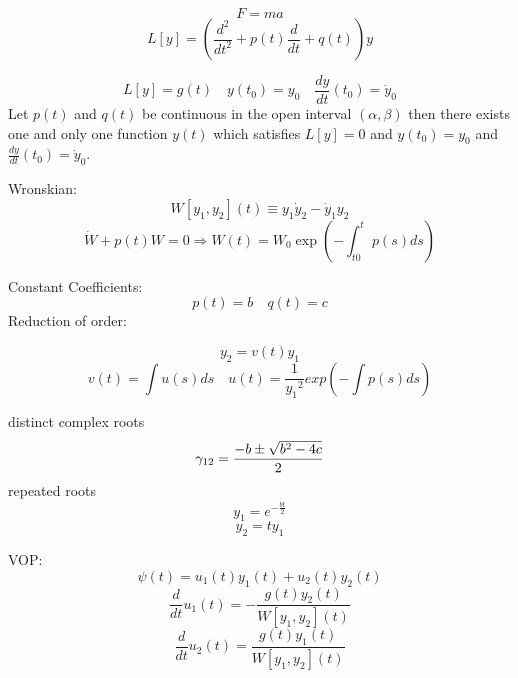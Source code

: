 \[
  F = m a
\]
\[
  L[y] =  \left( \frac{d^2}{dt^2} + p(t) \frac{d}{dt} + q(t) \right) y
\]

\[
  L[y] = g(t) \quad y(t_0) = y_0 \quad \frac{dy}{dt} (t_0) = {\dot y}_0
\]
Let $p(t)$ and $q(t)$ be continuous in the open interval $(\alpha,\beta)$ then
there exists one and only one function $y(t)$ which satisfies $L[y] = 0$ and
$y(t_0) = y_0$ and $\frac{dy}{dt}(t_0) = {\dot y}_0$.

Wronskian:
\[
  W[y_1,y_2](t) \equiv y_1 {\dot y}_2 - {\dot y}_1 y_2
\]
\[
  {\dot W} + p(t) W = 0 \Rightarrow W(t) = W_0 \exp \left( -\int_{t0}^{t} p(s) ds \right)
\]

Constant Coefficients:
\[
  p(t) = b \quad q(t) = c
\]
Reduction of order:

\[
  y_2 =v(t) y_1
\]
\[
  v(t) = \int u(s) ds \quad u(t) = \frac{1}{{y_1}^2} exp\left( -\int p(s) ds \right)
\]

distinct complex roots
\[
  \gamma_{1\\2} = \frac{-b \pm \sqrt{b^2 - 4c}}{2}
\]
repeated roots
\[
  y_1 = e^{-\frac{b t}{2}}
\]
\[
  y_2 = t y_1
\]

VOP:
\[
  \psi(t) = u_1(t) y_1(t) + u_2(t) y_2(t)
\]
\[
  \frac{d}{dt} u_1(t) = - \frac{ g(t) y_2(t) }{ W\left[y_1,y_2\right](t) }
\]
\[
  \frac{d}{dt} u_2(t) =   \frac{ g(t) y_1(t) }{ W\left[y_1,y_2\right](t) }
\]
